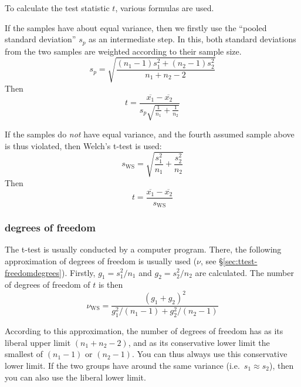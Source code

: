 \documentclass[
]{book}
\begin{document}
To calculate the test statistic \(t\), various formulas are used.

If the samples have about equal variance, then we firstly use
the ``pooled standard deviation'' \(s_p\) as an intermediate step. In this, both
standard deviations from the two samples are weighted according
to their sample size.
\begin{equation}
    s_p = \sqrt{ \frac{(n_1-1) s^2_1 + (n_2-1) s^2_2} {n_1+n_2-2} }
    \label{eq:sd-pooled}
\end{equation}
Then
\begin{equation}
  \label{eq:t-homoskedastic}
  t = \frac{ \overline{x_1}-\overline{x_2} } { s_p \sqrt{\frac{1}{n_1}+\frac{1}{n_2}} }
\end{equation}

If the samples do \emph{not} have equal variance, and the fourth assumed
sample above is thus violated, then Welch's t-test is
used:
\begin{equation}
  \label{eq:sd-WS}
  s_{\textrm{WS}} = \sqrt{\frac{s^2_1}{n_1}+\frac{s^2_2}{n_2} }
\end{equation}
Then
\begin{equation}
  \label{eq:t-WS}
  t = \frac{ \overline{x_1}-\overline{x_2} } { s_{\textrm{WS}} }
\end{equation}

\hypertarget{freedomdegrees}{%
\subsubsection{degrees of freedom}\label{freedomdegrees}}

The t-test is usually conducted by a computer program. There,
the following approximation of degrees of freedom is usually used
(\(\nu\), see §\ref{sec:ttest-freedomdegrees}).
Firstly, \(g_1=s^2_1/n_1\)
and \(g_2=s^2_2/n_2\) are calculated. The number of degrees of freedom of \(t\) is then
\begin{equation}
  \label{eq:df-WS}
  \nu_\textrm{WS} = 
        \frac {(g_1+g_2)^2} {g^2_1/(n_1-1) + g^2_2/(n_2-1)}
\end{equation}

According to this approximation, the number of degrees of freedom has as its liberal
upper limit \((n_1+n_2-2)\), and as its conservative lower limit the smallest
of \((n_1-1)\) or \((n_2-1)\). You can thus always use this conservative
lower limit. If the two groups have around the same variance
(i.e.~\(s_1 \approx s_2\)), then you can also use the liberal lower
limit.
\end{document}
